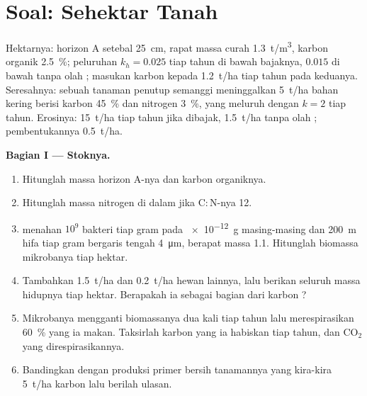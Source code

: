 \section{Soal: Sehektar Tanah}

\begin{problem}
\label{pb:b2:living-soil:1}
Hektarnya: horizon A setebal \qty{25}{cm}, rapat massa curah
\qty{1.3}{t/m^3}, karbon organik \qty{2.5}{\%}; peluruhan  $k_h =
0.025$ tiap tahun di bawah bajaknya, $0.015$ di bawah tanpa olah
; masukan karbon kepada  \qty{1.2}{t/ha} tiap tahun
pada keduanya. Seresahnya: sebuah tanaman penutup semanggi
meninggalkan \qty{5}{t/ha} bahan kering berisi karbon \qty{45}{\%} dan
nitrogen \qty{3}{\%}, yang meluruh dengan $k = 2$ tiap tahun. Erosinya:
\qty{15}{t/ha} tiap tahun jika dibajak, \qty{1.5}{t/ha} tanpa olah
; pembentukannya \qty{0.5}{t/ha}.

\medskip
\noindent\textbf{Bagian I --- Stoknya.}
\begin{enumerate}
  \item Hitunglah massa horizon A-nya dan karbon organiknya.
  \item Hitunglah massa nitrogen di dalam  jika
        $\mathrm{C:N}$-nya 12.
  \item {} menahan $10^{9}$ bakteri tiap gram pada \qty{e-12}{g}
        masing-masing dan \qty{200}{m} hifa tiap gram bergaris tengah
        \qty{4}{\micro m}, berapat massa 1.1. Hitunglah biomassa
        mikrobanya tiap hektar.
  \item Tambahkan \qty{1.5}{t/ha}  dan \qty{0.2}{t/ha}
        hewan lainnya, lalu berikan seluruh massa hidupnya tiap hektar.
        Berapakah ia sebagai bagian dari karbon ?
  \item Mikrobanya mengganti biomassanya dua kali tiap tahun lalu
        merespirasikan \qty{60}{\%} yang ia makan. Taksirlah karbon
        yang ia habiskan tiap tahun, dan $\mathrm{CO_2}$ yang
        direspirasikannya.
  \item Bandingkan dengan produksi primer bersih tanamannya yang
        kira-kira \qty{5}{t/ha} karbon lalu berilah ulasan.
\end{enumerate}


\end{problem}
